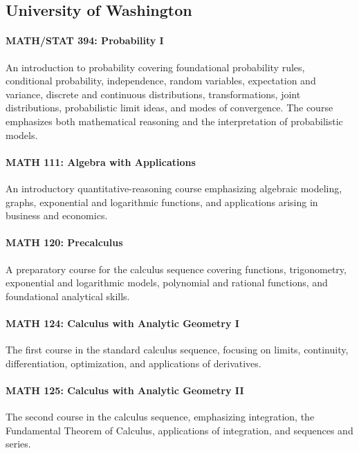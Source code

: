 \documentclass[11pt]{article}
\begin{document}
\subsection{University of Washington}

\paragraph{MATH/STAT 394: Probability I}

An introduction to probability covering
foundational probability rules,
conditional probability,
independence,
random variables,
expectation and variance,
discrete and continuous distributions,
transformations,
joint distributions, 
 probabilistic limit ideas, and modes of convergence.
The course emphasizes both mathematical reasoning and the
interpretation of probabilistic models.

\paragraph{MATH 111: Algebra with Applications}

An introductory quantitative-reasoning course emphasizing
algebraic modeling,
graphs,
exponential and logarithmic functions,
and applications arising in business and economics.

\paragraph{MATH 120: Precalculus}

A preparatory course for the calculus sequence covering
functions,
trigonometry,
exponential and logarithmic models,
polynomial and rational functions,
and foundational analytical skills.

\paragraph{MATH 124: Calculus with Analytic Geometry I}

The first course in the standard calculus sequence,
focusing on limits,
continuity,
differentiation,
optimization,
and applications of derivatives.

\paragraph{MATH 125: Calculus with Analytic Geometry II}

The second course in the calculus sequence,
emphasizing integration,
the Fundamental Theorem of Calculus,
applications of integration,
and sequences and series.
\end{document}
